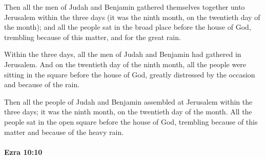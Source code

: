 			\begin{versebox}
					\item[BHS] 
					\item[LXX] 
					\item[ASV] Then all the men of Judah and Benjamin gathered themselves together unto Jerusalem within the three days (it was the ninth month, on the twentieth day of the month); and all the people sat in the broad place before the house of God, trembling because of this matter, and for the great rain.
					\item[NIV] Within the three days, all the men of Judah and Benjamin had gathered in Jerusalem. And on the twentieth day of the ninth month, all the people were sitting in the square before the house of God, greatly distressed by the occasion and because of the rain.
					\item[NRSV] Then all the people of Judah and Benjamin assembled at Jerusalem within the three days; it was the ninth month, on the twentieth day of the month. All the people sat in the open square before the house of God, trembling because of this matter and because of the heavy rain.
			\end{versebox}

		\paragraph{Ezra 10:10} %
			\label{EZRA-10-10}

